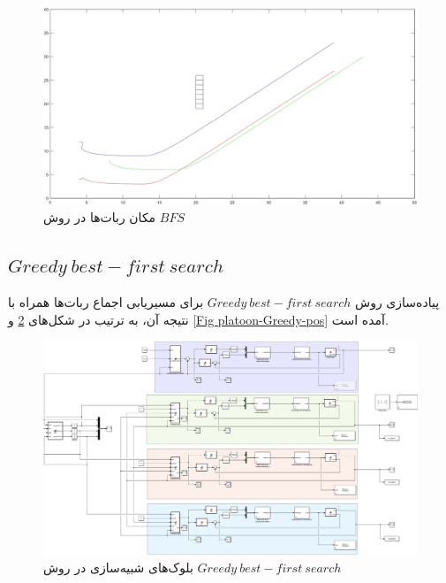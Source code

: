 \begin{figure}[!h]
	\centering
	\includegraphics[scale=0.2]{Images/platoon-BFS-pos.jpg}
	\caption{مکان ربات‌ها در روش $BFS$}\label{Fig platoon-BSF-pos}
\end{figure}

\newpage
\subsection{$Greedy~best-first~search$}
پیاده‌سازی روش $Greedy~best-first~search$ برای مسیریابی اجماع ربات‌ها همراه با نتیجه‌ آن، به ترتیب در شکل‌های \ref{Fig platoon-Greedy-simulink} و \ref{Fig platoon-Greedy-pos} آمده است.
\begin{figure}[!h]
	\centering
	\includegraphics[scale=0.22]{Images/platoon-Greedy-simulink.png}
	\caption{بلوک‌های شبیه‌سازی در روش $Greedy~best-first~search$}\label{Fig platoon-Greedy-simulink}
\end{figure}

